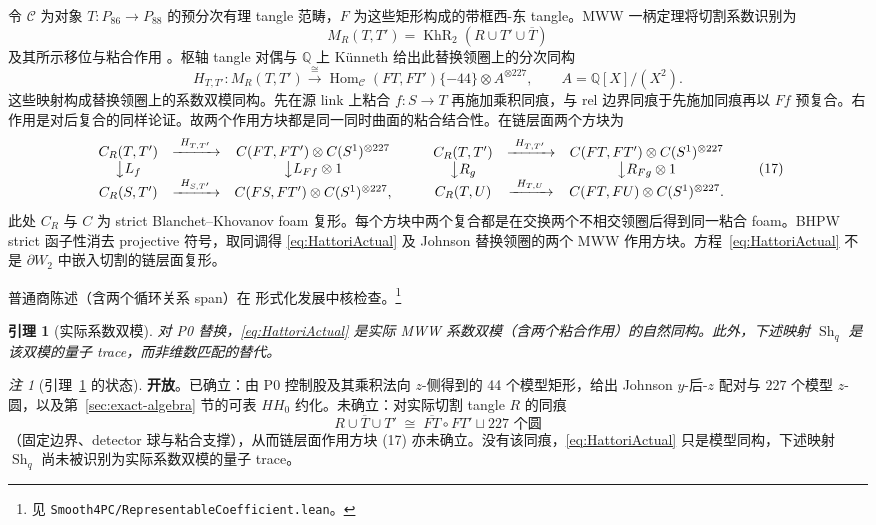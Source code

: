 \documentclass[11pt]{amsart}
\newtheorem{lemma}[theorem]{引理}
\theoremstyle{definition}
\theoremstyle{remark}
\newtheorem{remark}[theorem]{注}
\newcommand{\Q}{\mathbb{Q}}
\newcommand{\KhR}{\operatorname{KhR}}
\newcommand{\Open}{\textbf{开放}}
\begin{document}
令 $\mathcal C$ 为对象 $T:P_{86}\to P_{88}$ 的预分次有理 tangle 范畴，$F$ 为这些矩形构成的带框西-东 tangle。MWW 一柄定理将切割系数识别为
\[
M_R(T,T')=\KhR_2(R\cup T'\cup\overline T)
\]
及其所示移位与粘合作用
\cite[Theorem~4.7]{ManolescuWalkerWedrich2023}。枢轴 tangle 对偶与 $\Q$ 上 K\"unneth 给出此替换领圈上的分次同构
\begin{equation}\label{eq:HattoriActual}
H_{T,T'}:M_R(T,T')\xrightarrow{\cong}
\operatorname{Hom}_{\mathcal C}(FT,FT')\{-44\}
\otimes A^{\otimes227},
\qquad A=\Q[X]/(X^2).
\end{equation}
这些映射构成替换领圈上的系数双模同构。先在源 link 上粘合 $f:S\to T$ 再施加乘积同痕，与 rel 边界同痕于先施加同痕再以 $Ff$ 预复合。右作用是对后复合的同样论证。故两个作用方块都是同一同时曲面的粘合结合性。在链层面两个方块为
\[
\begin{array}{ccc}
C_R(T,T')&\xrightarrow{\ H_{T,T'}\ }&
C(FT,FT')\otimes C(S^1)^{\otimes227}\\
\big\downarrow {L_f}&&\big\downarrow {L_{Ff}\otimes1}\\
C_R(S,T')&\xrightarrow{\ H_{S,T'}\ }&
C(FS,FT')\otimes C(S^1)^{\otimes227},
\end{array}
\qquad
\begin{array}{ccc}
C_R(T,T')&\xrightarrow{\ H_{T,T'}\ }&
C(FT,FT')\otimes C(S^1)^{\otimes227}\\
\big\downarrow {R_g}&&\big\downarrow {R_{Fg}\otimes1}\\
C_R(T,U)&\xrightarrow{\ H_{T,U}\ }&
C(FT,FU)\otimes C(S^1)^{\otimes227}.
\end{array}
\tag{17}
\]
此处 $C_R$ 与 $C$ 为 strict Blanchet--Khovanov foam 复形。每个方块中两个复合都是在交换两个不相交领圈后得到同一粘合 foam。BHPW strict 函子性消去 projective 符号，取同调得 \eqref{eq:HattoriActual} 及 Johnson 替换领圈的两个 MWW 作用方块。方程~\eqref{eq:HattoriActual} 不是 $\partial W_2$ 中嵌入切割的链层面复形。

普通商陈述（含两个循环关系 span）在
形式化发展中核检查。\footnote{见
\texttt{Smooth4PC/RepresentableCoefficient.lean}。}

\begin{lemma}[实际系数双模]\label{lem:C1}
对 P0 替换，\eqref{eq:HattoriActual} 是实际 MWW 系数双模（含两个粘合作用）的自然同构。此外，下述映射 \(\operatorname{Sh}_q\) 是该双模的量子 trace，而非维数匹配的替代。
\end{lemma}

\begin{remark}[引理~\ref{lem:C1} 的状态]
\Open。已确立：由 P0 控制股及其乘积法向 $z$-侧得到的 44 个模型矩形，给出 Johnson $y$-后-$z$ 配对与 $227$ 个模型 $z$-圆，以及第~\ref{sec:exact-algebra} 节的可表 $HH_0$ 约化。未确立：对实际切割 tangle $R$ 的同痕
\[
R\cup\overline T\cup T'\;\cong\;\overline{FT}\circ FT'\sqcup 227\text{ 个圆}
\]
（固定边界、detector 球与粘合支撑），从而链层面作用方块 (17) 亦未确立。没有该同痕，\eqref{eq:HattoriActual} 只是模型同构，下述映射 $\operatorname{Sh}_q$ 尚未被识别为实际系数双模的量子 trace。
\end{remark}
\end{document}
